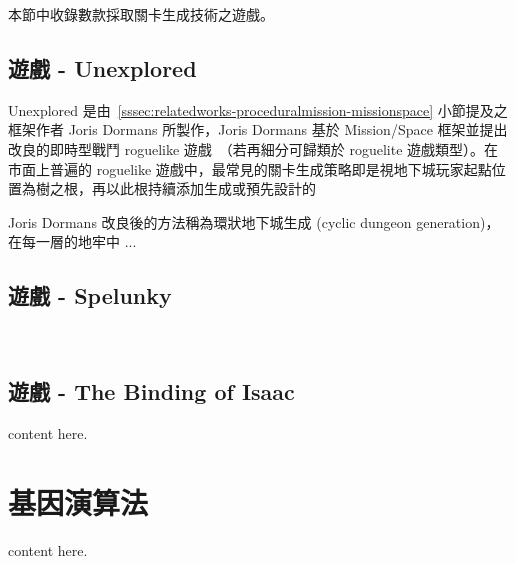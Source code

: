 本節中收錄數款採取關卡生成技術之遊戲。

\subsection{遊戲 - Unexplored}
\label{ssec:relatedworks-gameswithprocedural-unexplored}

Unexplored 是由~\ref{sssec:relatedworks-proceduralmission-missionspace} 小節提及之框架作者 Joris Dormans 所製作，Joris Dormans 基於 Mission/Space 框架並提出改良的即時型戰鬥 roguelike 遊戲~\cite{dormansUnexplored}（若再細分可歸類於 roguelite 遊戲類型）。在市面上普遍的 roguelike 遊戲中，最常見的關卡生成策略即是視地下城玩家起點位置為樹之根，再以此根持續添加生成或預先設計的

Joris Dormans 改良後的方法稱為環狀地下城生成 (cyclic dungeon generation)，在每一層的地牢中 ...

\subsection{遊戲 - Spelunky}
\label{ssec:relatedworks-gameswithprocedural-spelunky}

~\cite{SpelunkyGL01}~\cite{SpelunkyGL02}

\subsection{遊戲 - The Binding of Isaac}
\label{ssec:relatedworks-gameswithprocedural-isaac}

content here.


\section{基因演算法}
\label{sec:relatedworks-ga}

content here.
